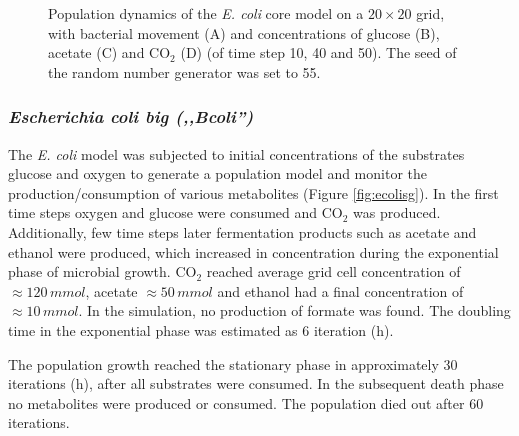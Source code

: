 \begin{figure}[h!]
{\begin{minipage}[t]{0.3\textwidth}
  \end{minipage}
  }
  \caption{Population dynamics of the \emph{E. coli} core model on a $20\times20$ grid, with bacterial movement (A) and concentrations of glucose (B), acetate (C) and CO$_2$ (D) (of time step 10, 40 and 50). The seed of the random number generator was set to 55.}
  \label{fig:ecoregrids}
\end{figure}

\subsubsection{\textit{Escherichia coli big (,,Bcoli'')}}
The \textit{E. coli} model was subjected to initial concentrations of the substrates glucose and oxygen to generate a population model and monitor the production/consumption of various metabolites (Figure \hyperref[fig:ecolisg]{\ref{fig:ecolisg}}). In the first time steps oxygen and glucose were consumed and CO$_2$ was produced. Additionally, few time steps later fermentation products such as acetate and ethanol were produced, which increased in concentration during the exponential phase of microbial growth. 
CO$_2$ reached average grid cell concentration of $\approx 120\, mmol$, acetate $\approx 50\, mmol$ and ethanol had a final concentration of $\approx 10\,mmol$.
In the simulation, no production of formate was found. The doubling time in the exponential phase was estimated as 6 iteration (h).

The population growth reached the stationary phase in approximately 30 iterations (h), after all substrates were consumed. In the subsequent death phase no metabolites were produced or consumed. The population died out after 60 iterations.

